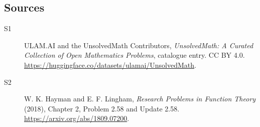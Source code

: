 \documentclass[11pt]{article}
\begin{document}
\subsection{Sources}
\begin{description}
\item[\hypertarget{source:statement:1}{S1}] ULAM.AI and the UnsolvedMath Contributors, \emph{UnsolvedMath: A Curated Collection of Open Mathematics Problems}, catalogue entry. CC BY 4.0. \url{https://huggingface.co/datasets/ulamai/UnsolvedMath}.
\item[\hypertarget{source:statement:2}{S2}] W. K. Hayman and E. F. Lingham, \emph{Research Problems in Function Theory} (2018), Chapter 2, Problem 2.58 and Update 2.58. \url{https://arxiv.org/abs/1809.07200}.
\end{description}
\label{end:statement}
\end{document}
